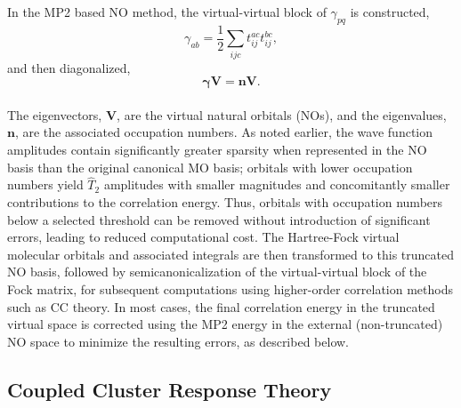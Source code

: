 In the MP2 based NO method, the virtual-virtual block of $\gamma_{pq}$
is constructed,
\\
\begin{equation}
\gamma_{ab} = \frac{1}{2}\sum_{ijc} t^{ac}_{ij}t^{bc}_{ij},
\label{Eq:dens}
\end{equation}
and then diagonalized,
\begin{equation}
\bm{\gamma} \bm{V} = \bm{n} \bm{V}.
\end{equation}
\\
The eigenvectors, $\bm{V}$, are the virtual natural orbitals (NOs), and the
eigenvalues, $\bm{n}$, are the associated occupation numbers.  As noted
earlier, the wave function amplitudes contain significantly greater sparsity
when represented in the NO basis than the original canonical MO basis;
orbitals with lower occupation numbers yield $\hat{T}_2$ amplitudes with
smaller magnitudes and concomitantly smaller contributions to the correlation
energy.  Thus, orbitals with occupation numbers below a selected threshold can
be removed without introduction of significant errors, leading to reduced
computational cost.  The Hartree-Fock virtual molecular orbitals and
associated integrals are then transformed to this truncated NO basis, followed
by semicanonicalization of the virtual-virtual block of the Fock matrix, for
subsequent computations using higher-order correlation methods such as CC
theory.  In most cases, the final correlation energy in the truncated virtual
space is corrected using the MP2 energy in the external (non-truncated) NO
space to minimize the resulting errors, as described below.

\subsection{Coupled Cluster Response Theory}

